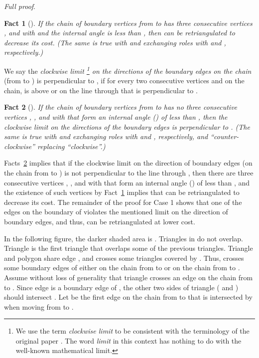 \documentclass[final]{siamltex}
\newtheorem{fact}{Fact}[theorem]
\newenvironment{fullproof}{\par{\it Full proof}. \ignorespaces}{\endproof}
\begin{document}
\begin{fullproof}
\begin{fact}[{\cite[Lemma 7]{drysdale2001exclusion}}]\label{lemma:diamond7}
If the chain of boundary vertices from  to  
has three consecutive vertices ,  and  with  
and the internal angle  is less than , then  can be retriangulated 
to decrease its cost. 
(The same is true with  and  exchanging roles with  and , respectively.)
\end{fact}

We say the {\em clockwise limit \footnote{ We use the term {\em clockwise limit} to be consistent with the 
terminology of the original paper \cite{drysdale2001exclusion}. The word {\em limit} in this context has nothing 
to do with the well-known mathematical limit.} on the directions of the boundary edges on the chain} (from  to )
is perpendicular to , if for every two consecutive vertices  and  on the chain,
 is above or on the line through  that is perpendicular to .

\begin{fact}[{\cite[Lemma 6]{drysdale2001exclusion}}]\label{lemma:diamond6}
If the chain of boundary vertices from  to  
has no 
three consecutive vertices , , and  with  
that form an internal angle () of less than , 
then the clockwise limit on the directions
of the boundary edges is perpendicular to . 
(The same is true with  and  exchanging roles with  and , respectively,
and ``counter-clockwise'' replacing ``clockwise''.)
\end{fact}



Facts~\ref{lemma:diamond6} implies that if the clockwise limit on the direction 
of boundary edges (on the chain from  to ) is not perpendicular to the line through , then
there are three consecutive vertices , , and  with  
that form an internal angle () of less than , and the existence of 
such vertices by Fact~\ref{lemma:diamond7} implies that  can be retriangulated 
to decrease its cost. The remainder of the proof for Case 1 shows that one of the edges 
on the boundary of  violates the mentioned
limit on the direction of boundary edges, and thus,  can be retriangulated at lower cost.



In the following figure, the darker shaded area is . Triangles in  do not overlap. 
Triangle  is the first triangle that overlaps some of the previous triangles.\label{case2}
Triangle  and polygon  share edge ,
and  crosses some triangles covered by . Thus,  crosses some boundary 
edges of  either on the chain from  to  or on the chain from  to .
Assume without loss of generality that triangle  crosses an edge on the chain from  to .
Since edge  is a boundary edge of , the other two sides of triangle  ( and ) should intersect .
Let  be the first edge on the chain from  to  that is intersected by  when moving from  to .


\end{fullproof}
\end{document}
